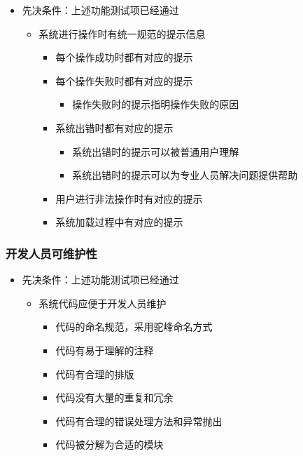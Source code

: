 \documentclass[hyperref, a4paper]{ctexart}
\providecommand{\tightlist}{%
  \setlength{\itemsep}{0pt}\setlength{\parskip}{0pt}}
\begin{document}
\begin{itemize}
\tightlist
\item
  先决条件：上述功能测试项已经通过

  \begin{itemize}
  \tightlist
  \item
    系统进行操作时有统一规范的提示信息

    \begin{itemize}
    \tightlist
    \item
      每个操作成功时都有对应的提示
    \item
      每个操作失败时都有对应的提示

      \begin{itemize}
      \tightlist
      \item
        操作失败时的提示指明操作失败的原因
      \end{itemize}
    \item
      系统出错时都有对应的提示

      \begin{itemize}
      \tightlist
      \item
        系统出错时的提示可以被普通用户理解
      \item
        系统出错时的提示可以为专业人员解决问题提供帮助
      \end{itemize}
    \item
      用户进行非法操作时有对应的提示
    \item
      系统加载过程中有对应的提示
    \end{itemize}
  \end{itemize}
\end{itemize}

\hypertarget{ux5f00ux53d1ux4ebaux5458ux53efux7ef4ux62a4ux6027}{%
\subsubsection{开发人员可维护性}\label{ux5f00ux53d1ux4ebaux5458ux53efux7ef4ux62a4ux6027}}

\begin{itemize}
\tightlist
\item
  先决条件：上述功能测试项已经通过

  \begin{itemize}
  \tightlist
  \item
    系统代码应便于开发人员维护

    \begin{itemize}
    \tightlist
    \item
      代码的命名规范，采用驼峰命名方式
    \item
      代码有易于理解的注释
    \item
      代码有合理的排版
    \item
      代码没有大量的重复和冗余
    \item
      代码有合理的错误处理方法和异常抛出
    \item
      代码被分解为合适的模块
    \end{itemize}
  \end{itemize}
\end{itemize}
\end{document}

